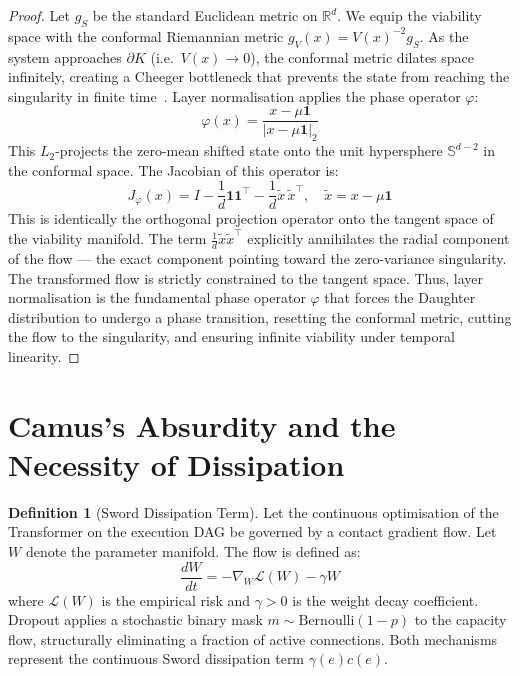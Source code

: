 \documentclass[11pt,a4paper]{article}
\theoremstyle{definition}
\newtheorem{definition}[theorem]{Definition}
\theoremstyle{remark}
\begin{document}
\begin{proof}
Let $g_S$ be the standard Euclidean metric on $\mathbb{R}^d$. We equip the viability space with the conformal Riemannian metric $g_V(x) = V(x)^{-2} g_S$. As the system approaches $\partial K$ (i.e.\ $V(x) \to 0$), the conformal metric dilates space infinitely, creating a Cheeger bottleneck that prevents the state from reaching the singularity in finite time~\cite{ba2016}. Layer normalisation applies the phase operator $\varphi$:
\[
  \varphi(x) = \frac{x - \mu\mathbf{1}}{|x - \mu\mathbf{1}|_2}
\]
This $L_2$-projects the zero-mean shifted state onto the unit hypersphere $\mathbb{S}^{d-2}$ in the conformal space. The Jacobian of this operator is:
\[
  J_\varphi(x) = I - \frac{1}{d}\mathbf{1}\mathbf{1}^\top - \frac{1}{d}\tilde{x}\,\tilde{x}^\top, \quad \tilde{x} = x - \mu\mathbf{1}
\]
This is identically the orthogonal projection operator onto the tangent space of the viability manifold. The term $\frac{1}{d}\tilde{x}\tilde{x}^\top$ explicitly annihilates the radial component of the flow --- the exact component pointing toward the zero-variance singularity. The transformed flow is strictly constrained to the tangent space. Thus, layer normalisation is the fundamental phase operator $\varphi$ that forces the Daughter distribution to undergo a phase transition, resetting the conformal metric, cutting the flow to the singularity, and ensuring infinite viability under temporal linearity.
\end{proof}


\section{Camus's Absurdity and the Necessity of Dissipation}

\begin{definition}[Sword Dissipation Term]\label{def:dissipation}
Let the continuous optimisation of the Transformer on the execution DAG be governed by a contact gradient flow. Let $W$ denote the parameter manifold. The flow is defined as:
\[
  \frac{dW}{dt} = -\nabla_W \mathcal{L}(W) - \gamma W
\]
where $\mathcal{L}(W)$ is the empirical risk and $\gamma > 0$ is the weight decay coefficient. Dropout applies a stochastic binary mask $m \sim \mathrm{Bernoulli}(1-p)$ to the capacity flow, structurally eliminating a fraction of active connections. Both mechanisms represent the continuous Sword dissipation term $\gamma(e)c(e)$.
\end{definition}
\end{document}
